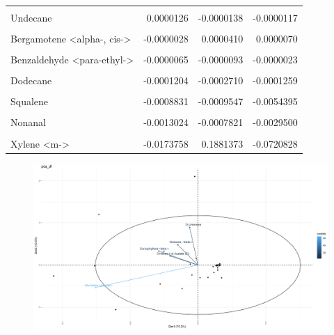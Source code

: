 \documentclass[12pt,final,CPage]{ufthesis}
\begin{document}
{\begin{table}
{\begin{tabular}[t]{lrrr}
  \cellcolor{gray!6}{Phellandrene <beta->} & \cellcolor{gray!6}{0.0002257} & \cellcolor{gray!6}{0.0001706} & \cellcolor{gray!6}{-0.0001171}\\
  Undecane & 0.0000126 & -0.0000138 & -0.0000117\\
  \cellcolor{gray!6}{Limonene oxide, trans-} & \cellcolor{gray!6}{0.0000065} & \cellcolor{gray!6}{-0.0000065} & \cellcolor{gray!6}{-0.0000158}\\
  Bergamotene <alpha-, cis-> & -0.0000028 & 0.0000410 & 0.0000070\\
  \addlinespace
  \cellcolor{gray!6}{Terpineol <alpha->} & \cellcolor{gray!6}{-0.0000035} & \cellcolor{gray!6}{-0.0000009} & \cellcolor{gray!6}{-0.0000102}\\
  Benzaldehyde <para-ethyl-> & -0.0000065 & -0.0000093 & -0.0000023\\
  \cellcolor{gray!6}{Hexadecane, 1-bromo-} & \cellcolor{gray!6}{-0.0000287} & \cellcolor{gray!6}{-0.0000616} & \cellcolor{gray!6}{-0.0000215}\\
  Dodecane & -0.0001204 & -0.0002710 & -0.0001259\\
  \cellcolor{gray!6}{Pentadecane} & \cellcolor{gray!6}{-0.0001940} & \cellcolor{gray!6}{0.0002776} & \cellcolor{gray!6}{0.0002476}\\
  \addlinespace
  Squalene & -0.0008831 & -0.0009547 & -0.0054395\\
  \cellcolor{gray!6}{p-Cymene} & \cellcolor{gray!6}{-0.0012868} & \cellcolor{gray!6}{0.0008397} & \cellcolor{gray!6}{0.0021706}\\
  Nonanal & -0.0013024 & -0.0007821 & -0.0029500\\
  \cellcolor{gray!6}{Sulindac sulfide} & \cellcolor{gray!6}{-0.0014697} & \cellcolor{gray!6}{0.0011056} & \cellcolor{gray!6}{-0.0001368}\\
  Xylene <m-> & -0.0173758 & 0.1881373 & -0.0720828\\
  \bottomrule
  \end{tabular}}
  \end{table}
  \begin{figure}

  {\centering \includegraphics[width=1\linewidth]{figure/rrv_volatiles_biplot_var_pca_df} 

}
\end{figure}}
\end{document}
